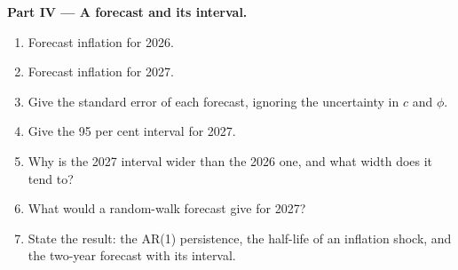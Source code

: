 \begin{problem}
\medskip
\noindent\textbf{Part IV --- A forecast and its interval.}
\begin{enumerate}[resume]
  \item Forecast inflation for 2026.
  \item Forecast inflation for 2027.
  \item Give the standard error of each forecast, ignoring the uncertainty in $c$ and $\phi$.
  \item Give the 95 per cent interval for 2027.
  \item Why is the 2027 interval wider than the 2026 one, and what width does it tend to?
  \item What would a random-walk forecast give for 2027?
  \item State the result: the AR(1) persistence, the half-life of an inflation shock, and the two-year forecast with its
  interval.
\end{enumerate}
\end{problem}
